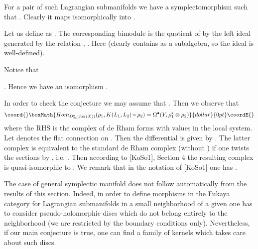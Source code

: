 \documentclass[a4paper,12pt]{article}
\begin{document}
For a pair of such Lagrangian submanifolds we have a symplectomorphism
\coordHE{} such that \coordHE{}. 
Clearly it maps isomorphically
\coordHE{} into \coordHE{} .

Let us define \coordHE{} as \coordHE{}.
The corresponding bimodule \coordHE{} is 
the quotient of \coordHE{} by the 
left ideal generated
by the relation \coordHE{}, \coordHE{}.
Here \coordHE{} (clearly \coordHE{} contains \coordHE{} as a subalgebra,
so the ideal is well-defined).

Notice that 

\coordHE{}. 
Hence we have an
isomorphism \coordHE{}.

In order to check the conjecture we may assume that \coordHE{}. Then we observe that
$$\coord{}\boxMath{Hom_{D^b_{\infty}(hol(X))}(\rho_1,K(L_1,L_2)\circ \rho_2)=
\Omega^{\bullet}(Y,\rho^{\ast}_1\otimes \rho_2)}{dollar}{0pt}\coordE{}$$
 where the RHS
is the complex of de Rham forms with values in the local system. Let \coordHE{}
denotes the flat connection on \coordHE{}. Then the
differential is given by \coordHE{}. The latter complex is equivalent to the standard
de Rham complex (without \coordHE{}) if one twists the sections by
\coordHE{}, i.e. \coordHE{}. Then according to [KoSo1], Section 4
the resulting complex is quasi-isomorphic to 
\coordHE{}. 
We remark that in the notation of [KoSo1] one has \coordHE{}.

\begin{rmk} The case of general symplectic manifold does not follow
automatically from the results of this section. Indeed, in order
to define morphisms in the Fukaya category for
Lagrangian submanifolds in a small neighborhood of a given
\coordHE{}  one has to consider pseudo-holomorphic
discs which do not belong entirely to the neighborhood (we are restricted by the boundary
conditions only). Nevertheless, if our main conjecture is true, one can find
a family of kernels \coordHE{} which takes care about such discs. 



\end{rmk}
\end{document}
